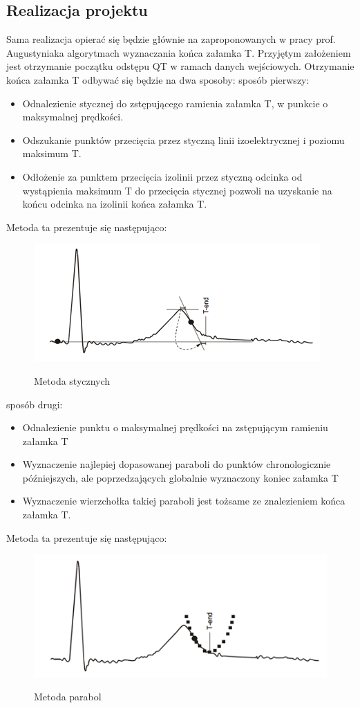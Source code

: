 \subsection{Realizacja projektu}
Sama realizacja opierać się będzie głównie na zaproponowanych w pracy prof. Augustyniaka algorytmach wyznaczania końca załamka T. Przyjętym założeniem jest otrzymanie początku odstępu QT w ramach danych wejściowych.
Otrzymanie końca załamka T odbywać się będzie na dwa sposoby:
sposób pierwszy:
\begin{itemize}
  \item Odnalezienie stycznej do zstępującego ramienia załamka T, w punkcie o maksymalnej prędkości.
  \item Odszukanie punktów przecięcia przez styczną linii izoelektrycznej i poziomu maksimum T.
  \item Odłożenie za punktem przecięcia izolinii przez styczną odcinka od wystąpienia maksimum T do przecięcia stycznej pozwoli na uzyskanie  na końcu odcinka na izolinii końca załamka T.
\end{itemize}


Metoda ta prezentuje się następująco:
\begin{figure}[H]
\centering
\includegraphics[scale=1.0]{QT_DISP/img/01}
\label{fig:Metoda 1}
\caption{Metoda stycznych}
\end{figure}

sposób drugi:
\begin{itemize}
  \item Odnalezienie punktu o maksymalnej prędkości na zstępującym ramieniu załamka T
  \item Wyznaczenie najlepiej dopasowanej paraboli do punktów chronologicznie późniejszych, ale poprzedzających globalnie wyznaczony koniec załamka T
  \item Wyznaczenie wierzchołka takiej paraboli jest tożsame ze znalezieniem końca załamka T.
\end{itemize}

Metoda ta prezentuje się następująco:
\begin{figure}[H]
\centering
\includegraphics[scale=1.0]{QT_DISP/img/02}
\label{fig:Metoda 2}
\caption{Metoda parabol}
\end{figure}

